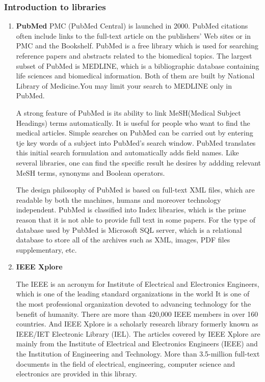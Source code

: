 \subsubsection{Introduction to libraries }

\begin{enumerate}
	
	\item\textbf{PubMed}
	\setlength{\parindent}{1em}
	 PMC (PubMed Central) is launched in 2000.
	 PubMed citations often include links to the full-text article on the publishers' Web sites or in PMC and the Bookshelf.
	 PubMed is a free library which is used for searching reference papers and abstracts related to the biomedical topics.
	 The largest subset of PubMed is MEDLINE, which is a bibliographic database containing life sciences and biomedical information.
	 Both of them are built by National Library of Medicine.You may limit your search to MEDLINE only in PubMed.
	 
	 A strong feature of PubMed is its ability to link MeSH(Medical Subject Headings) terms automatically. 
	 It is useful for people who want to find the medical articles. 
     Simple searches on PubMed can be carried out by entering tje key words of a subject into PubMed's search window.
     PubMed translates this initial search formulation and automatically adds field names.
	 Like several libraries, one can find the specific result he desires by addding relevant MeSH terms, synonyms and Boolean operators.
	 
	 The design philosophy of PubMed is based on full-text XML files, which are readable by both the machines, humans and moreover technology independent.
	 PubMed is classified into Index libraries, which is the prime reason that it is not able to provide full text in some papers.
	 For the type of database used by PubMed is Microsoft SQL server, which is a relational database to store all of 
	 the archives such as XML, images, PDF files supplementary, etc.
	  
		
	\item\textbf{IEEE Xplore}
	\setlength{\parindent}{1em}
	
	The IEEE is an acronym for Institute of Electrical and Electronics Engineers, which is one of the leading standard organizations in the world 
	It is one of the most professional organization devoted to advancing technology for the benefit of humanity.
	There are more than 420,000 IEEE members in over 160 countries.
	And IEEE Xplore is a scholarly research library formerly known as IEEE/IET Electronic Library (IEL).
	The articles covered by IEEE Xplore are mainly from the Institute of Electrical and Electronics Engineers (IEEE) and the Institution of Engineering and Technology.
	More than 3.5-million full-text documents in the field of electrical, engineering, computer science and electronics are provided in this library. 
	

\end{enumerate}
